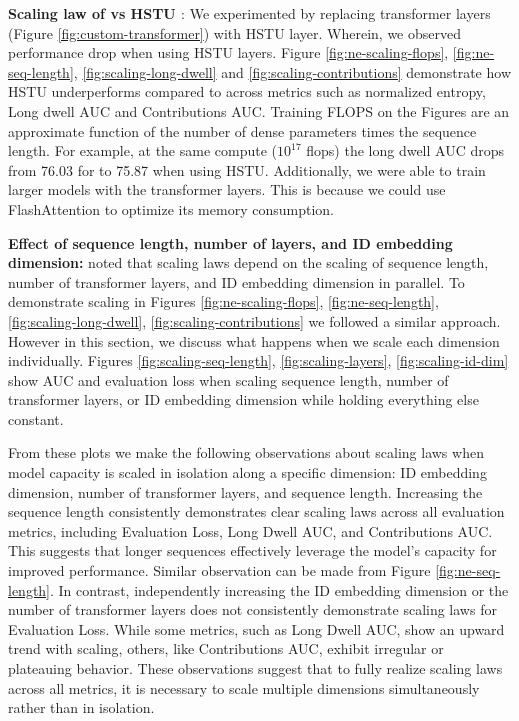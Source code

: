 \textbf{Scaling law of {\systemname} vs HSTU \cite{HSTU_paper_zhai24a}}: We experimented by replacing {\systemname} transformer layers (Figure \ref{fig:custom-transformer}) with HSTU layer. Wherein, we observed performance drop when using HSTU layers. Figure \ref{fig:ne-scaling-flops}, \ref{fig:ne-seq-length}, \ref{fig:scaling-long-dwell} and \ref{fig:scaling-contributions} demonstrate how HSTU underperforms compared to {\systemname} across metrics such as normalized entropy, Long dwell AUC and Contributions AUC. Training FLOPS on the Figures are an approximate function of the number of dense parameters times the sequence length. For example, at the same compute ($10^{17}$ flops) the long dwell AUC drops from 76.03 for {\systemname} to 75.87 when using HSTU. Additionally, we were able to train larger models with the {\systemname} transformer layers. This is because we could use FlashAttention to optimize its memory consumption.

\textbf{Effect of sequence length, number of layers, and ID embedding dimension:}
\cite{HSTU_paper_zhai24a} noted that {\systemname} scaling laws depend on the scaling of sequence length, number of transformer layers, and ID embedding dimension in parallel. To demonstrate scaling in Figures \ref{fig:ne-scaling-flops}, \ref{fig:ne-seq-length}, \ref{fig:scaling-long-dwell}, \ref{fig:scaling-contributions} we followed a similar approach. However in this section, we discuss what happens when we scale each dimension individually. Figures \ref{fig:scaling-seq-length}, \ref{fig:scaling-layers}, \ref{fig:scaling-id-dim} show AUC and evaluation loss when scaling sequence length, number of transformer layers, or ID
embedding dimension while holding everything else constant. 

From these plots we make the following observations about scaling laws when model capacity is scaled in isolation along a specific dimension: ID embedding dimension, number of transformer layers, and sequence length. Increasing the sequence length consistently demonstrates clear scaling laws across all evaluation metrics, including Evaluation Loss, Long Dwell AUC, and Contributions AUC. This suggests that longer sequences effectively leverage the model's capacity for improved performance. Similar observation can be made from Figure \ref{fig:ne-seq-length}. In contrast, independently increasing the ID embedding dimension or the number of transformer layers does not consistently demonstrate scaling laws for Evaluation Loss. While some metrics, such as Long Dwell AUC, show an upward trend with scaling, others, like Contributions AUC, exhibit irregular or plateauing behavior. These observations suggest that to fully realize scaling laws across all metrics, it is necessary to scale multiple dimensions simultaneously rather than in isolation.

